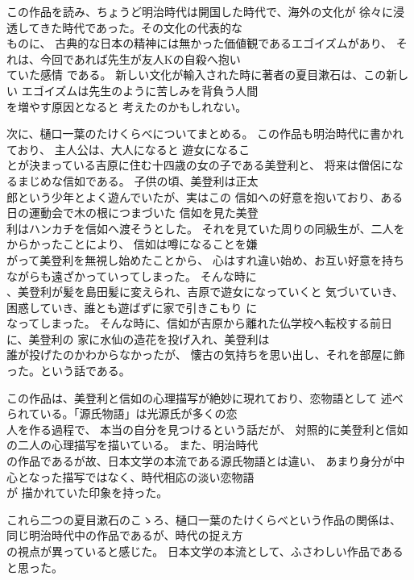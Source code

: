 \documentclass[a4paper,landscape]{tarticle}
\begin{document}
この作品を読み、ちょうど明治時代は開国した時代で、海外の文化が
徐々に浸透してきた時代であった。その文化の代表的な \\ ものに、
古典的な日本の精神には無かった価値観であるエゴイズムがあり、
それは、今回であれば先生が友人Kの自殺へ抱い \\ ていた感情
である。
新しい文化が輸入された時に著者の夏目漱石は、この新しい
エゴイズムは先生のように苦しみを背負う人間 \\ を増やす原因となると
考えたのかもしれない。

次に、樋口一葉のたけくらべについてまとめる。
この作品も明治時代に書かれており、
主人公は、大人になると
遊女になるこ \\ とが決まっている吉原に住む十四歳の女の子である美登利と、
将来は僧侶になるまじめな信如である。
子供の頃、美登利は正太 \\ 郎という少年とよく遊んでいたが、実はこの
信如への好意を抱いており、ある日の運動会で木の根につまづいた
信如を見た美登 \\ 利はハンカチを信如へ渡そうとした。
それを見ていた周りの同級生が、二人をからかったことにより、
信如は噂になることを嫌 \\ がって美登利を無視し始めたことから、
心はすれ違い始め、お互い好意を持ちながらも遠ざかっていってしまった。
そんな時に \\ 、美登利が髪を島田髪に変えられ、吉原で遊女になっていくと
気づいていき、困惑していき、誰とも遊ばずに家で引きこもり
に \\ なってしまった。
そんな時に、信如が吉原から離れた仏学校へ転校する前日に、美登利の
家に水仙の造花を投げ入れ、美登利は \\ 誰が投げたのかわからなかったが、
懐古の気持ちを思い出し、それを部屋に飾った。という話である。

この作品は、美登利と信如の心理描写が絶妙に現れており、恋物語として
述べられている。「源氏物語」は光源氏が多くの恋 \\ 人を作る過程で、
本当の自分を見つけるという話だが、
対照的に美登利と信如の二人の心理描写を描いている。
また、明治時代 \\ の作品であるが故、日本文学の本流である源氏物語とは違い、
あまり身分が中心となった描写ではなく、時代相応の淡い恋物語 \\ が
描かれていた印象を持った。

これら二つの夏目漱石のこゝろ、樋口一葉のたけくらべという作品の関係は、
同じ明治時代中の作品であるが、時代の捉え方 \\ の視点が異っていると感じた。
日本文学の本流として、ふさわしい作品であると思った。
\end{document}
